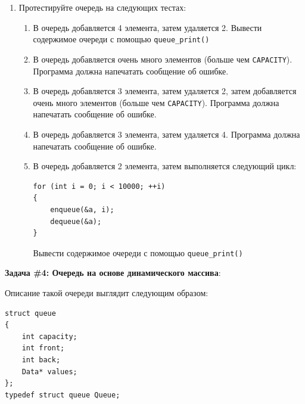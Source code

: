 \documentclass[10pt]{article}
\begin{document}
\begin{enumerate}
\item Протестируйте очередь на следующих тестах:
\begin{enumerate}
\item В очередь добавляется 4 элемента, затем удаляется 2. Вывести содержимое очереди с помощью \texttt{queue\_print()}
\item В очередь добавляется очень много элементов (больше чем \texttt{CAPACITY}). Программа должна напечатать сообщение об ошибке.
\item В очередь добавляется 3 элемента, затем удаляется 2, затем добавляется очень много элементов (больше чем \texttt{CAPACITY}). Программа должна напечатать сообщение об ошибке.
\item В очередь добавляется 3 элемента, затем удаляется 4. Программа должна напечатать сообщение об ошибке.
\item В очередь добавляется 2 элемента, затем выполняется следующий цикл:
\begin{verbatim}
for (int i = 0; i < 10000; ++i)
{
    enqueue(&a, i);
    dequeue(&a);
}
\end{verbatim}
Вывести содержимое очереди с помощью \texttt{queue\_print()}
\end{enumerate}
\end{enumerate}

\textbf{Задача \#4: Очередь на основе динамического массива}:

Описание такой очереди выглядит следующим образом:
\begin{lstlisting}
struct queue
{
    int capacity;
    int front;
    int back;
    Data* values;
};
typedef struct queue Queue;
\end{lstlisting}
\end{document}
